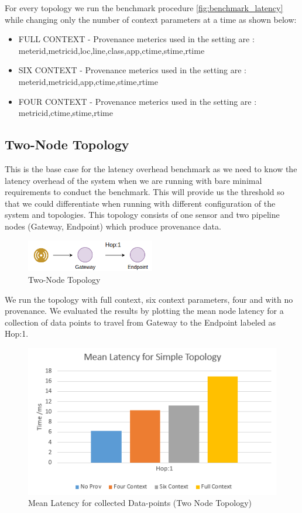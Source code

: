 For every topology we run the benchmark procedure \ref{fig:benchmark_latency} while changing only the number of context parameters at a time as shown below:

\begin{itemize}
	\item FULL CONTEXT - Provenance meterics used in the setting are :
	meterid,metricid,loc,line,class,app,ctime,stime,rtime
	\item SIX CONTEXT - Provenance meterics used in the setting are :
	meterid,metricid,app,ctime,stime,rtime
	\item FOUR CONTEXT - Provenance meterics used in the setting are :
	metricid,ctime,stime,rtime
\end{itemize}

\subsection{Two-Node Topology}
This is the base case for the latency overhead benchmark as we need to know the latency overhead of the system when we are running with bare minimal requirements to conduct the benchmark. This will provide us the threshold so that we could differentiate when running with different configuration of the system and topologies. This topology consists of one sensor and two pipeline nodes (Gateway, Endpoint) which produce provenance data. 

\begin{figure}[H]
	\center
	\includegraphics[width=0.5\textwidth]{figures/latencytopo_two.png}
	\caption{Two-Node Topology}
	\label{fig:two_topo}
\end{figure}

We run the topology with full context, six context parameters, four and with no provenance. We evaluated the results by plotting the mean node latency for a collection of data points
to travel from Gateway to the Endpoint labeled as Hop:1.

\begin{figure}[H]
	\center
	\includegraphics[width=\textwidth]{figures/simpletopology_latency.png}
	\caption{Mean Latency for collected Data-points (Two Node Topology)}
	\label{fig:twotopology_latency}
\end{figure}

